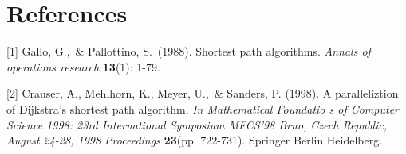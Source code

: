 \documentclass{article}
\begin{document}
\begin{comment}
\section*{Broader Impact}

Authors are required to include a statement of the broader impact of their work, including its ethical aspects and future societal consequences. 
Authors should discuss both positive and negative outcomes, if any. For instance, authors should discuss a) 
who may benefit from this research, b) who may be put at disadvantage from this research, c) what are the consequences of failure of the system, and d) whether the task/method leverages
biases in the data. If authors believe this is not applicable to them, authors can simply state this.

Use unnumbered first level headings for this section, which should go at the end of the paper. {\bf Note that this section does not count towards the eight pages of content that are allowed.}

\begin{ack}
Use unnumbered first level headings for the acknowledgments. All acknowledgments
go at the end of the paper before the list of references. Moreover, you are required to declare 
funding (financial activities supporting the submitted work) and competing interests (related financial activities outside the submitted work). 
More information about this disclosure can be found at: \url{https://neurips.cc/Conferences/2020/PaperInformation/FundingDisclosure}.


Do {\bf not} include this section in the anonymized submission, only in the final paper. You can use the \texttt{ack} environment provided in the style file to autmoatically hide this section in the anonymized submission.
\end{ack}

\end{comment} 

\section*{References}
\small

[1] Gallo, G.,\ \& Pallottino, S.\ (1988). Shortest path algorithms. {\it Annals 
  of operations research} {\bf 13}(1): 1-79.

[2] Crauser, A., Mehlhorn, K., Meyer, U.,\ \& Sanders, P. (1998). A paralleliztion 
  of Dijkstra's shortest path algorithm. {\it In Mathematical Foundatio
  s of Computer Science 1998: 23rd International Symposium MFCS'98 Brno, 
  Czech Republic, August 24-28, 1998 Proceedings} {\bf 23}(pp. 722-731). Springer Berlin Heidelberg.
\end{document}

